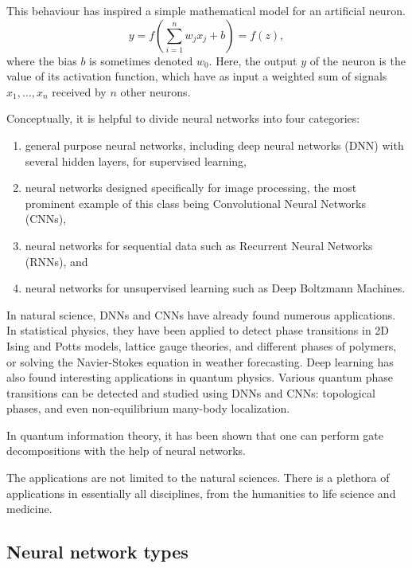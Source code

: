 \documentclass[%
oneside,                 %
final,                   %
10pt]{article}
\begin{document}
This behaviour has inspired a simple mathematical model for an artificial neuron.
\begin{equation}
 y = f\left(\sum_{i=1}^n w_jx_j + b \right) = f(z),
 \label{artificialNeuron}
\end{equation}
where the bias $b$ is sometimes denoted $w_0$.
Here, the output $y$ of the neuron is the value of its activation function, which have as input
a weighted sum of signals $x_1, \dots ,x_n$ received by $n$ other neurons.

Conceptually, it is helpful to divide neural networks into four
categories:
\begin{enumerate}
\item general purpose neural networks, including deep neural networks (DNN) with several hidden layers, for supervised learning,

\item neural networks designed specifically for image processing, the most prominent example of this class being Convolutional Neural Networks (CNNs),

\item neural networks for sequential data such as Recurrent Neural Networks (RNNs), and

\item neural networks for unsupervised learning such as Deep Boltzmann Machines.
\end{enumerate}

\noindent
In natural science, DNNs and CNNs have already found numerous
applications. In statistical physics, they have been applied to detect
phase transitions in 2D Ising and Potts models, lattice gauge
theories, and different phases of polymers, or solving the
Navier-Stokes equation in weather forecasting.  Deep learning has also
found interesting applications in quantum physics. Various quantum
phase transitions can be detected and studied using DNNs and CNNs:
topological phases, and even non-equilibrium many-body
localization. 

In quantum information theory, it has been shown that one can perform
gate decompositions with the help of neural networks. 

The applications are not limited to the natural sciences. There is a
plethora of applications in essentially all disciplines, from the
humanities to life science and medicine.

\subsection{Neural network types}
\end{document}
